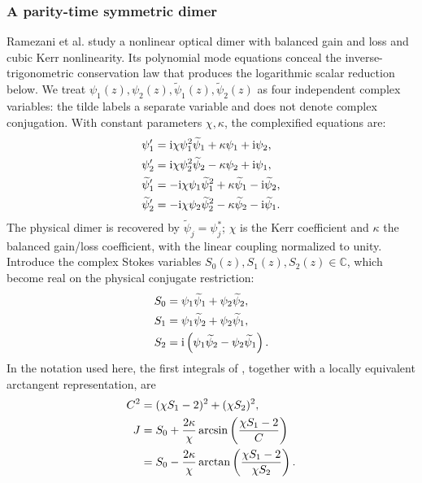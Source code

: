 \documentclass[11pt,a4paper]{article}
\numberwithin{equation}{section}
\begin{document}
\subsubsection{A parity-time symmetric dimer}

Ramezani et al. \cite{ramezaniUnidirectionalNonlinearPTsymmetric2010} study a nonlinear optical dimer with balanced gain and loss and cubic Kerr nonlinearity. Its polynomial mode equations conceal the inverse-trigonometric conservation law that produces the logarithmic scalar reduction below. We treat $\psi_1(z),\psi_2(z),\widetilde\psi_1(z),\widetilde\psi_2(z)$ as four independent complex variables: the tilde labels a separate variable and does not denote complex conjugation. With constant parameters $\chi,\kappa$, the complexified equations are:
\begin{align}
    \psi_1' &= \mathrm{i}\chi\psi_1^2\widetilde{\psi}_1+\kappa\psi_1+\mathrm{i}\psi_2, \notag \\
    \psi_2' &= \mathrm{i}\chi\psi_2^2\widetilde{\psi}_2-\kappa\psi_2+\mathrm{i}\psi_1, \notag \\
    \widetilde{\psi}_1' &= -\mathrm{i}\chi\psi_1\widetilde{\psi}_1^2+\kappa\widetilde{\psi}_1-\mathrm{i}\widetilde{\psi}_2, \notag \\
    \widetilde{\psi}_2' &= -\mathrm{i}\chi\psi_2\widetilde{\psi}_2^2-\kappa\widetilde{\psi}_2-\mathrm{i}\widetilde{\psi}_1. \label{eq:ramezani-system}
\end{align}
The physical dimer is recovered by $\widetilde\psi_j=\psi_j^*$; $\chi$ is the Kerr coefficient and $\kappa$ the balanced gain/loss coefficient, with the linear coupling normalized to unity.
Introduce the complex Stokes variables $S_0(z),S_1(z),S_2(z)\in\mathbb C$, which become real on the physical conjugate restriction:
\begin{align}
    S_0
    &=
    \psi_1\widetilde{\psi}_1
    +
    \psi_2\widetilde{\psi}_2,
    \notag \\
    S_1
    &=
    \psi_1\widetilde{\psi}_2
    +
    \psi_2\widetilde{\psi}_1,
    \notag \\
    S_2
    &=
    \mathrm{i}
    \left(
        \psi_1\widetilde{\psi}_2
        -
        \psi_2\widetilde{\psi}_1
    \right).
\end{align}
In the notation used here, the first integrals of \cite{ramezaniUnidirectionalNonlinearPTsymmetric2010}, together with a locally equivalent arctangent representation, are
\begin{align}
    C^2
    &=
    (\chi S_1-2)^2+(\chi S_2)^2,
    \notag \\
    J
    &=
    S_0
    +
    \frac{2\kappa}{\chi}
    \arcsin\left(\frac{\chi S_1-2}{C}\right)
    \notag \\
    &=
    S_0
    -
    \frac{2\kappa}{\chi}
    \arctan\left(
        \frac{\chi S_1-2}{\chi S_2}
    \right).
    \label{eq:ramezani-original-integrals}
\end{align}
\end{document}
